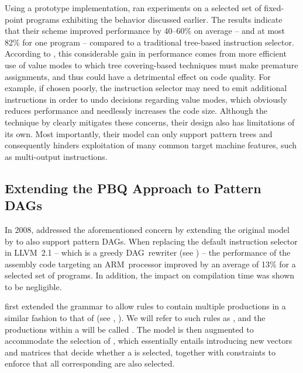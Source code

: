 Using a prototype implementation, \citeauthor{Eckstein2003} ran experiments on a
selected set of fixed-point \glspl{program} exhibiting the behavior discussed
earlier.
%
The results indicate that their scheme improved performance by
\mbox{40--60\%} on average -- and at most 82\% for one \gls{program} -- compared
to a traditional \gls{tree}-based \gls{instruction selector}.
%
According to
\citeauthor{Eckstein2003}, this considerable gain in performance comes from more
efficient use of value modes to which \gls{tree covering}-based techniques must
make premature assignments, and thus could have a detrimental effect on code
quality.
%
For example, if chosen poorly, the \gls{instruction selector} may need
to emit additional \glspl{instruction} in order to undo decisions regarding
value modes, which obviously reduces performance and needlessly increases the
code size.
%
Although the technique by \citeauthor{Eckstein2003} clearly mitigates
these concerns, their design also has limitations of its own.
%
Most importantly,
their  model can only support \glspl{pattern tree} and
consequently hinders exploitation of many common \gls{target machine} features,
such as \glspl{multi-output instruction}.


\subsection{Extending the PBQ Approach to Pattern DAGs}

In 2008, \textcite{Ebner2008} addressed the aforementioned concern by extending
the original  model by \citeauthor{Eckstein2003} to also
support \glspl{pattern DAG}.
%
When replacing the default \gls{instruction
  selector} in \gls{LLVM}~2.1 -- which is a greedy \gls{DAG}~rewriter (see
) -- the performance of the \gls{assembly code} targeting an
\gls{ARM}~processor improved by an average of 13\% for a selected set of
\glspl{program}.
%
In addition, the impact on compilation time was shown to be
negligible.

\citeauthor{Ebner2008} first extended the \gls{grammar} to allow \glspl{rule} to
contain multiple \glspl{production} in a similar fashion to that of
\textcite{Scharwaechter2007} (see
, ).
%
We will refer
to such \glspl{rule} as \tcomplexRules, and the \glspl{production} within a
\tcomplexRule will be called \tproxyRules.
%
The  model is
then augmented to accommodate the selection of \tcomplexRules, which essentially
entails introducing new vectors and matrices that decide whether a \tcomplexRule
is selected, together with constraints to enforce that all corresponding
\tproxyRules are also selected.

